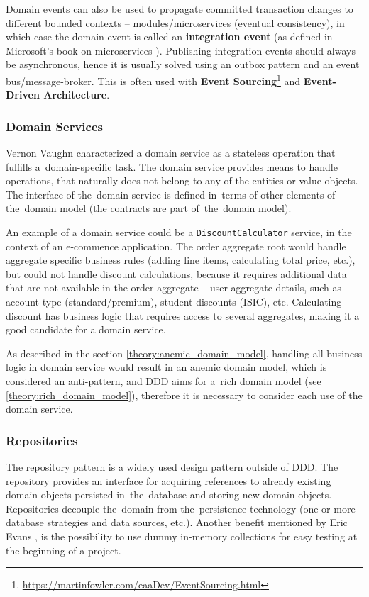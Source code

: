 Domain events can also be used to propagate committed transaction changes to different bounded contexts -- modules/microservices (eventual consistency), in which case the domain event is called an \textbf{integration event} (as defined in Microsoft's book on microservices \cite{ms:microservices}). Publishing integration events should always be asynchronous, hence it is usually solved using an outbox pattern and an event bus/message-broker. This is often used with \textbf{Event Sourcing}\footnote{\url{https://martinfowler.com/eaaDev/EventSourcing.html}} and \textbf{Event-Driven Architecture}. 

\subsubsection{Domain Services}
Vernon Vaughn \cite{vv:impl_ddd} characterized a domain service as a stateless operation that fulfills a~domain-specific task. The domain service provides means to handle operations, that naturally does not belong to any of the entities or value objects. The interface of the~domain service is defined in~terms of other elements of the~domain model (the contracts are part of~the~domain model).

An example of a domain service could be a \texttt{DiscountCalculator} service, in the context of an e-commence application. The order aggregate root would handle aggregate specific business rules (adding line items, calculating total price, etc.), but could not handle discount calculations, because it requires additional data that are not available in the order aggregate -- user aggregate details, such as account type (standard/premium), student discounts (ISIC), etc. Calculating discount has business logic that requires access to several aggregates, making it a good candidate for a domain service.

As described in the section \ref{theory:anemic_domain_model}, handling all business logic in domain service would result in an anemic domain model, which is considered an anti-pattern, and DDD aims for a~rich domain model (see \ref{theory:rich_domain_model}), therefore it is necessary to consider each use of the domain service.

\subsubsection{Repositories}
The repository pattern is a widely used design pattern outside of DDD. The repository provides an interface for acquiring references to already existing domain objects persisted in~the~database and storing new domain objects. Repositories decouple the~domain from the~persistence technology (one or more database strategies and data sources, etc.). Another benefit mentioned by Eric Evans \cite{eric_evans:ddd}, is the possibility to use dummy in-memory collections for easy testing at the beginning of a project.

